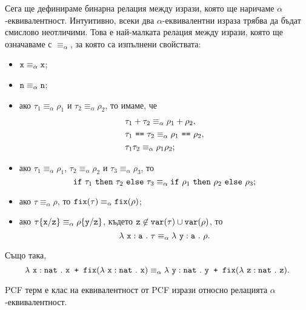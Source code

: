 Сега ще дефинираме бинарна релация между изрази, която ще наричаме $\alpha$-ек\-ви\-ва\-лент\-ност.
Интуитивно, всеки два $\alpha$-еквивалентни израза трябва да бъдат смислово неотличими.
Това е най-малката релация между изрази, която ще означаваме с $\equiv_\alpha$, за която са изпълнени свойствата:
\begin{itemize}
\item
  $\texttt{x} \equiv_\alpha \texttt{x}$;
\item
  $\texttt{n} \equiv_\alpha \texttt{n}$;
\item
  ако $\tau_1 \equiv_\alpha \rho_1$ и $\tau_2 \equiv_\alpha \rho_2$, то имаме, че
  \begin{align*}
    & \tau_1 + \tau_2 \equiv_\alpha \rho_1 + \rho_2,\\
    & \tau_1\ \vv{==}\ \tau_2 \equiv_\alpha \rho_1\ \vv{==}\ \rho_2,\\
    & \tau_1 \tau_2 \equiv_\alpha \rho_1 \rho_2;
  \end{align*}
\item
  ако $\tau_1 \equiv_\alpha \rho_1$, $\tau_2 \equiv_\alpha \rho_2$ и $\tau_3 \equiv_\alpha \rho_3$, то
  \[\texttt{if}\ \tau_1\ \texttt{then}\ \tau_2\ \texttt{else}\ \tau_3 \equiv_\alpha \texttt{if}\ \rho_1\ \texttt{then}\ \rho_2\ \texttt{else}\ \rho_3;\]
\item
  ако $\tau \equiv_\alpha \rho$, то $\texttt{fix}(\tau) \equiv_\alpha \texttt{fix}(\rho)$;
\item  
  ако $\tau\{\texttt{x}/{\texttt{z}}\} \equiv_\alpha \rho\{\texttt{y}/{\texttt{z}}\}$, където $\texttt{z} \not\in \texttt{var}(\tau) \cup \texttt{var}(\rho)$, то
  \[\lambda~\texttt{x}:\texttt{a}~.~{\tau} \equiv_\alpha \lambda~\texttt{y}:\texttt{a}~.~{\rho}.\]
\end{itemize}

Също така,
\[\lambda~\texttt{x}:\texttt{nat}~.~{\texttt{x + }\texttt{fix}(\lambda~\texttt{x}:\texttt{nat}~.~{\texttt{x}})} \equiv_\alpha \lambda~\texttt{y}:\texttt{nat}~.~{\texttt{y + }\texttt{fix}(\lambda~\texttt{z}:\texttt{nat}~.~{\texttt{z}})}.\]

\begin{framed}
\begin{definition}
  PCF терм е клас на еквивалентност от PCF изрази относно релацията $\alpha$-еквивалентност.
\end{definition}
\end{framed}

